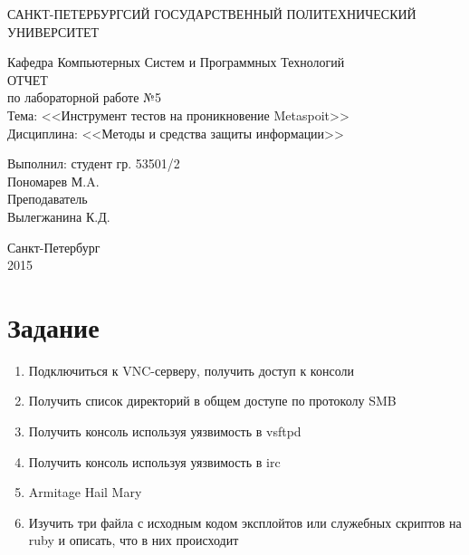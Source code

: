 \documentclass[utf8x, 12pt]{G7-32}
\begin{document}
\frontmatter 


\begin{center} 

\large САНКТ-ПЕТЕРБУРГСИЙ ГОСУДАРСТВЕННЫЙ ПОЛИТЕХНИЧЕСКИЙ УНИВЕРСИТЕТ

\large Кафедра Компьютерных Систем и Программных Технологий \\[5.5cm] 

\huge ОТЧЕТ \\[0.6cm] %
\large по лабораторной работе №5\\
\large Тема: <<Инструмент тестов на проникновение Metaspoit>>\\
\large Дисциплина: <<Методы и средства защиты информации>>\\[3.7cm]

\end{center} 

\begin{flushright}
Выполнил: студент гр. 53501/2 \\
Пономарев М.A. \\[1.2cm]


Преподаватель \\
Вылегжанина К.Д.
\end{flushright}


\vfill 

\begin{center} 
\large Санкт-Петербург \\
2015
\end{center} 

\thispagestyle{empty}



\thispagestyle{empty}
\setcounter{page}{0}
\tableofcontents
\clearpage
\mainmatter


\chapter{Задание}

\begin{enumerate}
	\item Подключиться к VNC-серверу, получить доступ к консоли
	\item Получить список директорий в общем доступе по протоколу SMB
	\item Получить консоль используя уязвимость в vsftpd
	\item Получить консоль используя уязвимость в irc
	\item Armitage Hail Mary
	\item Изучить три файла с исходным кодом эксплойтов или служебных скриптов на ruby и описать, что в них происходит
\end{enumerate}
\end{document}
